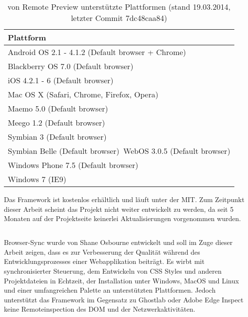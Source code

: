 	\begin{table}[H]
 		\centering
			\begin{tabular}{| p{13cm} |}
			
			\hline
				Plattform\\
			\hline
			\hline
				Android OS 2.1 - 4.1.2 (Default browser + Chrome)\\
				Blackberry OS 7.0 (Default browser)\\
				iOS 4.2.1 - 6 (Default browser)\\
				Mac OS X (Safari, Chrome, Firefox, Opera)\\
				Maemo 5.0 (Default browser)\\
				Meego 1.2 (Default browser)\\
				Symbian 3 (Default browser)\\
				Symbian Belle (Default browser)\
				WebOS 3.0.5 (Default browser)\\
				Windows Phone 7.5 (Default browser)\\	
				Windows 7 (IE9)\\
				\hline
				\end{tabular}
			\caption{von Remote Preview unterstützte Plattformen (stand 19.03.2014, letzter \Gls{Commit} 7dc48caa84)}
	\end{table} 
	Das \Gls{Framework} ist kostenlos erhältlich und läuft unter der \Gls{MIT}. Zum Zeitpunkt dieser Arbeit scheint das Projekt nicht 		weiter entwickelt zu werden, da seit 5 Monaten auf der Projektseite keinerlei Aktualisierungen vorgenommen wurden.

		
	\subsection{}
	Browser-Sync wurde von Shane Osbourne entwickelt und soll im Zuge dieser Arbeit zeigen, dass es zur Verbesserung der Qualität während des Entwicklungsprozesses einer Webapplikation beiträgt. Es wirbt mit synchronisierter Steuerung, dem Entwickeln von CSS Styles und anderen Projektdateien in Echtzeit, der Installation unter Windows, MacOS und Linux und einer umfangreichen Palette an unterstützten Plattformen. Jedoch unterstützt das \Gls{Framework} im Gegensatz zu Ghostlab oder Adobe Edge Inspect keine Remoteinspection des \Gls{DOM} und der Netzwerkaktivitäten.
	
